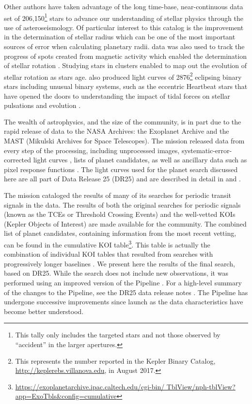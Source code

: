 Other authors have taken advantage of the long time-base, near-continuous data set of 206,150\footnote{This tally only includes the targeted stars and not those observed by ``accident'' in the larger apertures.} stars to advance our understanding of stellar physics through the use of asteroseismology. Of particular interest to this catalog is the improvement in the determination of stellar radius \citep[e.g.,][]{Huber2014a,Mathur2017ApJS} which can be one of the most important sources of error when calculating planetary radii. \Kepler{} data was also used to track the progress of spots created from magnetic activity which enabled the determination of stellar rotation \citep[e.g.][]{Aigrain2015,Garcia2014,McQuillan2014}. Studying stars in clusters enabled \citet{Meibom2011} to map out the evolution of stellar rotation as stars age. \Kepler{} also produced light curves of 2876\footnote{This represents the number reported in the Kepler Binary Catalog, \url{http://keplerebs.villanova.edu}, in August 2017.} eclipsing binary stars \citep{Prsa2011,Kirk2016} including unusual binary systems, such as the eccentric Heartbeat stars \citep{Welsh2011,Thompson2012,Shporer2016hb} that have opened the doors to understanding the impact of tidal forces on stellar pulsations and evolution \citep[e.g.,][]{Hambleton2017,Fuller2017}.

The wealth of astrophysics, and the size of the \Kepler{} community, is in part due to the rapid release of \Kepler{} data to the NASA Archives: the Exoplanet Archive \citep[][]{Akeson2013} and the MAST (Mikulski Archives for Space Telescopes). The \Kepler{} mission released data from every step of the processing, including unprocessed images, systematic-error-corrected light curves \citep{Stumpe2014}, lists of planet candidates, as well as ancillary data such as pixel response functions \citep{Bryson2010b}. The light curves used for the planet search discussed here are all part of Data Release 25 (DR25) and are described in detail in \citet{DRN25} and \citet{KDCH}.

The mission cataloged the results of many of its searches for periodic transit signals in the data.  The results of both the original searches for periodic signals (known as the TCEs or Threshold Crossing Events) and the well-vetted KOIs (Kepler Objects of Interest) are made available for the community.  The combined list of  planet candidates, containing information from the most recent vetting, can be found in the cumulative KOI table\footnote{\url{https://exoplanetarchive.ipac.caltech.edu/cgi-bin/ TblView/nph-tblView?app=ExoTbls\&config=cumulative}}. This table is actually the combination of individual KOI tables that resulted from searches with progressively longer baselines \citep{Borucki2011a, Batalha2013, Burke2014, Rowe2015cat, Mullally2015cat,Coughlin2016}. We present here the results of the final search, based on DR25. While the search does not include new observations, it was performed using an improved version of the \Kepler{} Pipeline \citep[version 9.3,][]{Jenkins2017}. For a high-level summary of the changes to the Pipeline, see the DR25 data release notes \citep{DRN25}. The \Kepler{} Pipeline has undergone successive improvements since launch as the data characteristics have become better understood.

